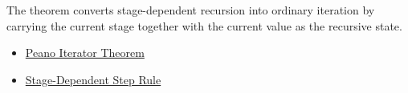 \begin{remark*}[Interpretation]
The theorem converts stage-dependent recursion into ordinary iteration by
carrying the current stage together with the current value as the recursive
state.
\end{remark*}

\begin{dependencies}
\begin{itemize}
  \item \hyperref[thm:peano-iterator-theorem]{Peano Iterator Theorem}
  \item \hyperref[def:stage-dependent-step-rule]{Stage-Dependent Step Rule}
\end{itemize}
\end{dependencies}

